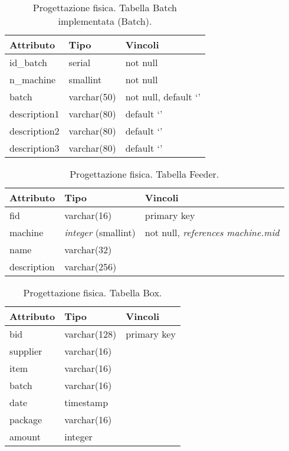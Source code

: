 \begin{table}
\begin{tabular}{| l | l | l |}
  \hline Attributo & Tipo & Vincoli\\
  \hline id\_batch & serial & not null \\
  \hline n\_machine & smallint & not null \\
  \hline batch & varchar(50) & not null, default \lq\rq\\
  \hline description1 & varchar(80) & default \lq\rq\\
  \hline description2 & varchar(80) & default \lq\rq\\
  \hline description3 & varchar(80) & default \lq\rq\\
  \hline
\end{tabular}
\label{tab:batchtableimpl}
\caption[Documentazione ER: relazioni]{Progettazione fisica. Tabella Batch implementata (Batch).}
\end{table}

\begin{table}
\begin{tabular}{| l | l | l |}
  \hline Attributo & Tipo & Vincoli\\
  \hline fid & varchar(16) & primary key \\
  \hline machine & \textit{integer} (smallint) & not null, \textit{references
  machine.mid}\\
  \hline name & varchar(32) & \\
  \hline description & varchar(256) & \\
  \hline
\end{tabular}
\label{tab:feedertable}
\caption[Documentazione ER: relazioni]{Progettazione fisica. Tabella Feeder.}
\end{table}

\begin{table}
\begin{tabular}{| l | l | l |}
  \hline Attributo & Tipo & Vincoli\\
  \hline bid & varchar(128) & primary key \\
  \hline supplier & varchar(16) & \\
  \hline item & varchar(16) & \\
  \hline batch & varchar(16) & \\
  \hline date & timestamp & \\
  \hline package & varchar(16) & \\
  \hline amount & integer & \\
  \hline
\end{tabular}
\label{tab:boxtable}
\caption[Documentazione ER: relazioni]{Progettazione fisica. Tabella Box.}
\end{table}

